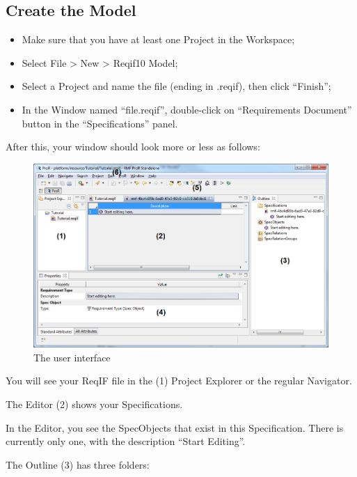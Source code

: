 \subsection{Create the Model}

\begin{itemize}

\item
  Make sure that you have at least one Project in the Workspace;
\item
  Select File \textgreater{} New \textgreater{} Reqif10 Model;
\item
  Select a Project and name the file (ending in .reqif), then click
  ``Finish'';
\item
  In the Window named ``file.reqif'', double-click on ``Requirements
  Document'' button in the ``Specifications'' panel.
\end{itemize}

After this, your window should look more or less as follows:

\begin{figure}[h!]
  \centering
  \includegraphics[width=\linewidth]{../rmf-images/pror-screenshot.png}
  \caption{The \pror{} user interface}
  \label{fig:user_interface_overview}
\end{figure}

You will see your ReqIF file in the (1) Project Explorer or the regular
Navigator.

The Editor (2) shows your Specifications.

In the Editor, you see the SpecObjects that exist in this Specification.
There is currently only one, with the description ``Start Editing''.

The Outline (3) has three folders:

